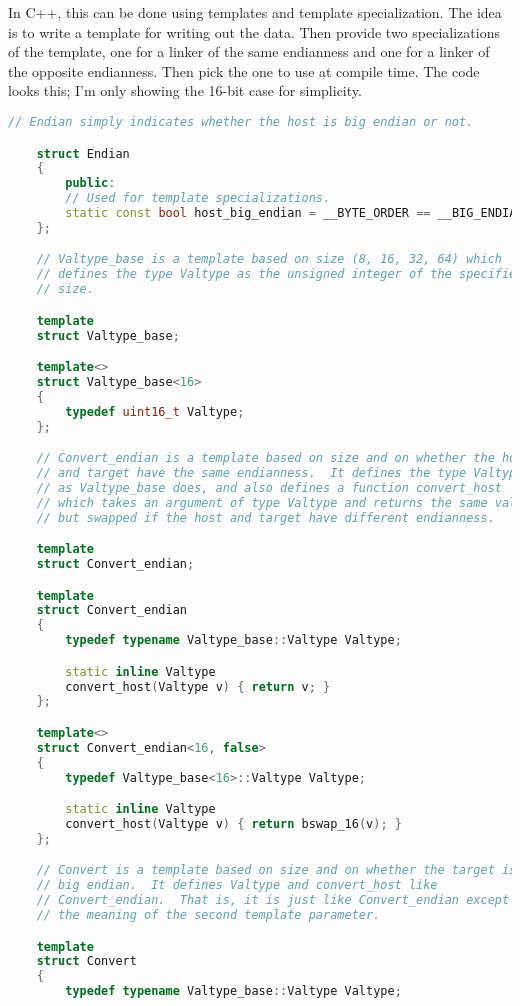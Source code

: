 In C++, this can be done using templates and template specialization. The
idea is to write a template for writing out the data. Then provide two
specializations of the template, one for a linker of the same endianness
and one for a linker of the opposite endianness. Then pick the one to use
at compile time. The code looks this; I'm only showing the 16-bit case for
simplicity.

\begin{lstlisting}[language=C++]
    // Endian simply indicates whether the host is big endian or not.

    struct Endian
    {
        public:
        // Used for template specializations.
        static const bool host_big_endian = __BYTE_ORDER == __BIG_ENDIAN;
    };

    // Valtype_base is a template based on size (8, 16, 32, 64) which
    // defines the type Valtype as the unsigned integer of the specified
    // size.

    template
    struct Valtype_base;

    template<>
    struct Valtype_base<16>
    {
        typedef uint16_t Valtype;
    };

    // Convert_endian is a template based on size and on whether the host
    // and target have the same endianness.  It defines the type Valtype
    // as Valtype_base does, and also defines a function convert_host
    // which takes an argument of type Valtype and returns the same value,
    // but swapped if the host and target have different endianness.

    template
    struct Convert_endian;

    template
    struct Convert_endian
    {
        typedef typename Valtype_base::Valtype Valtype;

        static inline Valtype
        convert_host(Valtype v) { return v; }
    };

    template<>
    struct Convert_endian<16, false>
    {
        typedef Valtype_base<16>::Valtype Valtype;

        static inline Valtype
        convert_host(Valtype v) { return bswap_16(v); }
    };

    // Convert is a template based on size and on whether the target is
    // big endian.  It defines Valtype and convert_host like
    // Convert_endian.  That is, it is just like Convert_endian except in
    // the meaning of the second template parameter.

    template
    struct Convert
    {
        typedef typename Valtype_base::Valtype Valtype;


\end{lstlisting}
